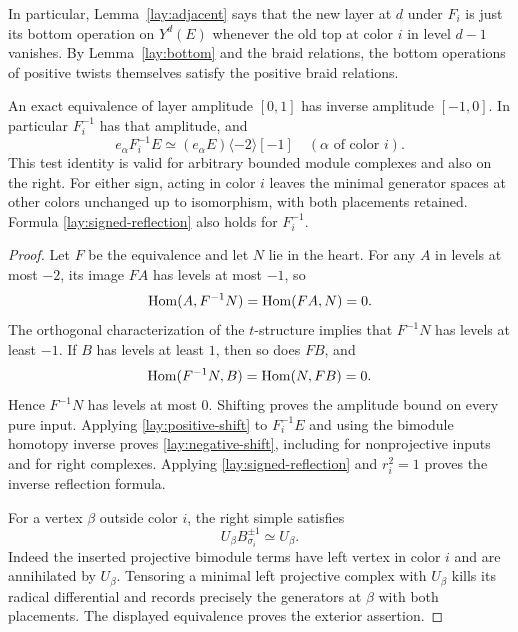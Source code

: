 In particular, Lemma~\ref{lay:adjacent} says that the new layer at $d$
under $F_i$ is just its bottom operation on $Y^d(E)$ whenever the
old top at color $i$ in level $d-1$ vanishes.  By
Lemma~\ref{lay:bottom} and the braid relations, the bottom operations
of positive twists themselves satisfy the positive braid relations.

\begin{lemma}
\label{lay:inverse}
An exact equivalence of layer amplitude $[0,1]$ has inverse amplitude
$[-1,0]$.  In particular $F_i^{-1}$ has that amplitude, and
\begin{equation}
 e_\alpha F_i^{-1}E\simeq(e_\alpha E)\langle-2\rangle[-1]
 \quad(\alpha\text{ of color }i).
 \label{lay:negative-shift}
\end{equation}
This test identity is valid for arbitrary bounded module complexes
and also on the right.  For either sign, acting in color $i$ leaves
the minimal generator spaces at other colors unchanged up to
isomorphism, with both placements retained.  Formula
\eqref{lay:signed-reflection} also holds for $F_i^{-1}$.
\end{lemma}

\begin{proof}
Let $F$ be the equivalence and let $N$ lie in the heart.  For any $A$
in levels at most $-2$, its image $FA$ has levels at most $-1$, so
\[
 \operatorname{Hom}(A,F^{-1}N)=\operatorname{Hom}(FA,N)=0.
\]
The orthogonal characterization of the $t$-structure implies that
$F^{-1}N$ has levels at least $-1$.  If $B$ has levels at least $1$,
then so does $FB$, and
\[
 \operatorname{Hom}(F^{-1}N,B)=\operatorname{Hom}(N,FB)=0.
\]
Hence $F^{-1}N$ has levels at most $0$.  Shifting proves the amplitude
bound on every pure input.  Applying \eqref{lay:positive-shift} to
$F_i^{-1}E$ and using the bimodule homotopy inverse proves
\eqref{lay:negative-shift}, including for nonprojective inputs and
for right complexes.  Applying \eqref{lay:signed-reflection} and
$r_i^2=1$ proves the inverse reflection formula.

For a vertex $\beta$ outside color $i$, the right simple satisfies
\[
 U_\beta B_{\sigma_i}^{\pm1}\simeq U_\beta.
\]
Indeed the inserted projective bimodule terms have left vertex in
color $i$ and are annihilated by $U_\beta$.  Tensoring a minimal left
projective complex with $U_\beta$ kills its radical differential and
records precisely the generators at $\beta$ with both placements.
The displayed equivalence proves the exterior assertion.
\end{proof}

